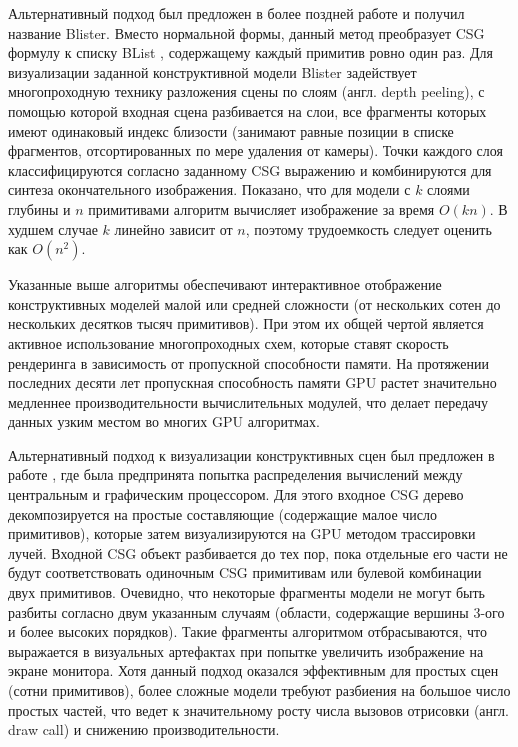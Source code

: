 Альтернативный подход был предложен в более поздней работе \cite{hable2005blister} и получил название Blister. Вместо нормальной формы, данный метод преобразует CSG формулу к списку BList \cite{rossignac1999blist}, содержащему каждый примитив ровно один раз. Для визуализации заданной конструктивной модели Blister задействует многопроходную технику разложения сцены по слоям (англ. depth peeling), с помощью которой входная сцена разбивается на слои, все фрагменты которых имеют одинаковый индекс близости (занимают равные позиции в списке фрагментов, отсортированных по мере удаления от камеры). Точки каждого слоя классифицируются согласно заданному CSG выражению и комбинируются для синтеза окончательного изображения. Показано, что для модели с $k$ слоями глубины и $n$ примитивами алгоритм вычисляет изображение за время $O(kn)$. В худшем случае $k$ линейно зависит от $n$, поэтому трудоемкость следует оценить как $O(n^2)$.

Указанные выше алгоритмы обеспечивают интерактивное отображение конструктивных моделей малой или средней  сложности (от нескольких сотен до нескольких десятков тысяч примитивов). При этом их общей чертой является активное использование многопроходных схем, которые ставят скорость рендеринга в зависимость от пропускной способности памяти. На протяжении последних десяти лет пропускная способность памяти GPU растет значительно медленнее производительности вычислительных модулей,  что делает передачу данных узким местом во многих GPU алгоритмах.

Альтернативный подход к визуализации конструктивных сцен был предложен в работе \cite{romeiro2006hardware}, где была предпринята попытка распределения вычислений между центральным и графическим процессором. Для этого входное CSG дерево декомпозируется на простые составляющие (содержащие малое число примитивов), которые затем визуализируются на GPU методом трассировки лучей. Входной CSG объект разбивается до тех пор, пока отдельные его части не будут соответствовать одиночным CSG примитивам или булевой  комбинации двух примитивов. Очевидно, что некоторые фрагменты модели не могут быть разбиты согласно двум указанным случаям (области, содержащие вершины 3-ого и более высоких порядков). Такие фрагменты алгоритмом отбрасываются, что выражается в визуальных артефактах при попытке увеличить изображение на экране монитора. Хотя данный подход оказался эффективным для простых сцен (сотни примитивов), более сложные модели требуют разбиения на большое число простых частей, что ведет к значительному росту числа вызовов отрисовки (англ. draw call) и снижению производительности.

